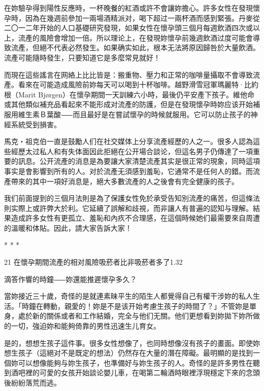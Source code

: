 \documentclass[12pt,UTF8]{ctexbook}
\begin{document}
在妳驗孕得到陽性反應時，一杯晚餐的紅酒或許不會讓妳擔心。許多女性在發現懷孕時，因為在幾週前參加一兩場酒精派对，喝下超过一兩杯酒而感到緊張。丹麥從二〇一二年开始的人口基礎研究發現，如果女性在懷孕頭三個月每週飲酒四次或以上，流產的風險會增加一倍。所以理论上，在發現妳懷孕前幾週飲酒过度可能會導致流產，但絕不代表必然發生。如果确实如此，根本无法將原因歸咎於大量飲酒。流產可能隨時發生，只要知道它是多麼常見就好！

而現在這些謠言在网絡上比比皆是：搬重物、壓力和正常的咖啡量攝取不會導致流產。看來在可能造成風險前妳每天可以喝到十杯咖啡。越野滑雪冠軍瑪麗特·比約根（Marit Bjørgen）在懷孕期間一天訓練六小時，最後仍平安產下孩子。維他命或其他類似補充品看起來不能形成对流產的防護，但是在發現懷孕時妳应该开始補服用維生素Ｂ葉酸⸺而且最好是在嘗試懷孕的時候就服用。它可以防止孩子的神經系統受到損害。

馬克‧祖克伯一直是鼓勵人们在社交媒体上分享流產經歷的人之一。很多人認為這些經歷太过私人和有失体面因此拒絕在公开場合談论，但這名男子仍傳達了一項重要的訊息。公开流產的消息是為要讓大家清楚流產其实是很正常的現象，同時這項事实是會影響到所有的人。对於流產无須感到羞恥，它通常不是任何人的錯。而流產帶來的其中一項好消息是，絕大多數流產的人之後會有完全健康的孩子。

我们前面提到的三個月法則是為了保護女性免於承受告知別流產的痛苦，但這條法則实際上或許弊大於利。它延續了誤解和歧視，而非讓人有普遍的認知与理解。結果造成許多女性有更孤立、羞恥和內疚不合理感，在這個時候她们最需要來自周遭的溫暖和体貼。因此，請大家告訴大家！





* * *



21	在懷孕期間流產的相对風險吸菸者比非吸菸者多了1.32%





滴答作響的時鐘⸺妳還能推遲懷孕多久？




當妳接近三十歲，奇怪的是就連素昧平生的陌生人都覺得自己有權干涉妳的私人生活。「時鐘在轉動，親愛的！妳是不是该开始考慮生孩子的時間了？」不管妳是單身，處於新的關係或者和工作結婚，完全与他们无關。他们更想看到妳拋下妳所做的一切，強迫妳和能夠倚靠的男性迅速生儿育女。

是的，想想生孩子這件事。很多女性想像了，也同時想像沒有孩子的畫面。即使妳想生孩子（這絕对不是既定的想法）仍然存在大量的潛在障礙。最明顯的是找到一個妳可以想像能夠与妳生孩子，也準備好与妳生孩子的人。奇怪的是許多男性在聽到酒吧裡的可愛的女孩开始談论嬰儿車，在喝第二輪酒時眼裡浮現穩定下來的念頭後紛紛落荒而逃。
\end{document}
